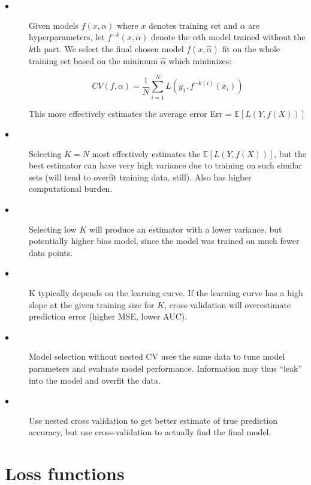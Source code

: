 \documentclass{article}
\begin{document}
\begin{description}

  \item[$\bullet$] Given models $f(x,\alpha)$ where $x$ denotes training set and $\alpha$ are hyperparameters, let $f^{-k}(x,\alpha)$ denote the $\alpha$th model trained without the $k$th part. We select the final chosen model $f(x,\hat{\alpha})$ fit on the whole training set based on the minimum $\hat{\alpha}$ which minimizes:
  
  \[CV(f, \alpha) = \frac{1}{N}\sum_{i=1}^N L(y_1, f^{-k(i)}(x_i))\]
  
  This more effectively estimates the average error Err = $\mathbb{E}[L(Y,f(X))]$
  
  \item[$\bullet$] Selecting $K=N$ most effectively estimates the $\mathbb{E}[L(Y,f(X))]$, but the best estimator can have very high variance due to training on such similar sets (will tend to overfit training data, still). Also has higher computational burden.
  
  \item[$\bullet$] Selecting low $K$ will produce an estimator with a lower variance, but potentially higher bias model, since the model was trained on much fewer data points.
  
  \item[$\bullet$] K typically depends on the learning curve. If the learning curve has a high slope at the given training size for $K$, cross-validation will overestimate prediction error (higher MSE, lower AUC).
  
  \item[$\bullet$] Model selection without nested CV uses the same data to tune model parameters and evaluate model performance. Information may thus “leak” into the model and overfit the data. 
  \item[$\bullet$] Use nested cross validation to get better estimate of true prediction accuracy, but use cross-validation to actually find the final model. 

\end{description}

\section{Loss functions}
\end{document}
